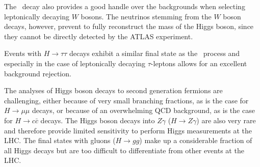 The \HWW\ decay also provides a good handle over the backgrounds when selecting leptonically decaying $W$ bosons.
The neutrinos stemming from the $W$ boson decays, however, prevent to fully reconstruct the mass of the Higgs boson, since they cannot be directly detected by the ATLAS experiment.


Events with $H \to \tau\tau $ decays exhibit a similar final state as the \HWW\ process and especially in the case of leptonically decaying $\tau$-leptons allows for an excellent background rejection. 

The analyses of Higgs boson decays to second generation fermions are challenging, either because of very small branching fractions, as is the case for $H \to \mu\mu$ decays, or because of an overwhelming QCD background, as is the case for $H \to c\bar{c}$ decays.
The Higgs boson decays into $Z\gamma$ ($H \to Z\gamma$) are also very rare and therefore provide limited sensitivity to perform Higgs measurements at the LHC. 
The final states with gluons ($H \to gg$) make up a considerable fraction of all Higgs decays but are too difficult to differentiate from other events at the LHC.



